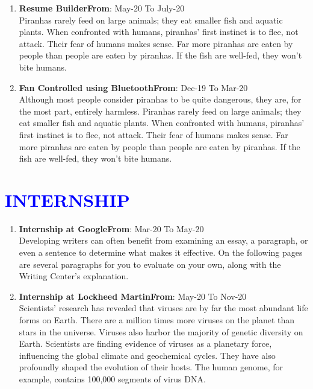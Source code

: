 \documentclass{article}
\begin{document}
\vspace{4pt}
\begin{enumerate}
	\item {\textbf{Resume Builder}}\hfill {\textbf{From}}: May-20 To July-20\\
	Piranhas rarely feed on large animals; they eat smaller fish and aquatic plants. When confronted with humans, piranhas’ first instinct is to flee, not attack. Their fear of humans makes sense. Far more piranhas are eaten by people than people are eaten by piranhas. If the fish are well-fed, they won’t bite humans.
	\item {\textbf{Fan Controlled using Bluetooth}}\hfill {\textbf{From}}: Dec-19 To Mar-20\\
	Although most people consider piranhas to be quite dangerous, they are, for the most part, entirely harmless. Piranhas rarely feed on large animals; they eat smaller fish and aquatic plants. When confronted with humans, piranhas’ first instinct is to flee, not attack. Their fear of humans makes sense. Far more piranhas are eaten by people than people are eaten by piranhas. If the fish are well-fed, they won’t bite humans.
\end{enumerate}
	
\vspace{3pt}
\section*{\large{\textcolor{blue}{\uppercase{Internship}}}}

\vspace{4pt}
\begin{enumerate}
	\item {\textbf{Internship at Google}}\hfill {\textbf{From}}: Mar-20 To May-20\\
	Developing writers can often benefit from examining an essay, a paragraph, or even a sentence to determine what makes it effective. On the following pages are several paragraphs for you to evaluate on your own, along with the Writing Center's explanation.
	\item {\textbf{Internship at Lockheed Martin}}\hfill {\textbf{From}}: May-20 To Nov-20\\
	 Scientists' research has revealed that viruses are by far the most abundant life forms on Earth. There are a million times more viruses on the planet than stars in the universe. Viruses also harbor the majority of genetic diversity on Earth. Scientists are finding evidence of viruses as a planetary force, influencing the global climate and geochemical cycles. They have also profoundly shaped the evolution of their hosts. The human genome, for example, contains 100,000 segments of virus DNA.
\end{enumerate}
\end{document}
